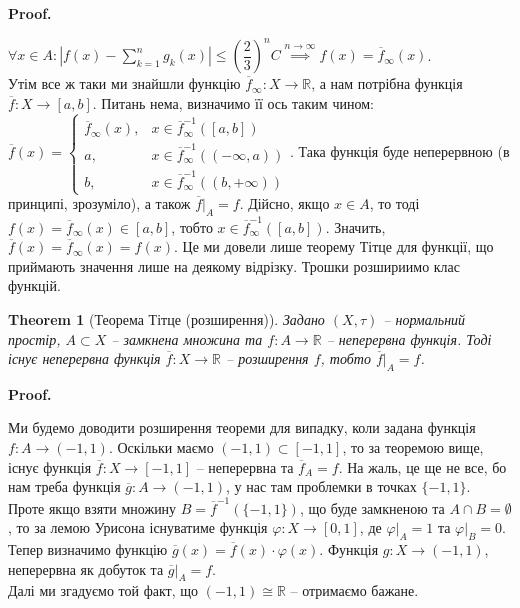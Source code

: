 \documentclass[a4paper, 10pt]{article}
\makeatletter
\theoremstyle{theoremdd}
\newtheorem{theorem}{Theorem}[subsection]
\renewenvironment{proof}[1][Proof.\\]{\par
\pushQED{\hfill \qed}%
\normalfont \topsep6\p@\@plus6\p@\relax
\trivlist
\item\relax
{\bfseries
#1\@addpunct{.}}\hspace\labelsep\ignorespaces
}{%
\popQED\endtrivlist\@endpefalse
}
\makeatother
\begin{document}
\begin{proof}
$\forall x \in A: \displaystyle\left| f(x) - \sum_{k=1}^n g_k(x) \right| \leq \left(\dfrac{2}{3}\right)^n C \overset{n \to \infty}{\implies} f(x) = \overline{f}_\infty(x)$.\\
Утім все ж таки ми знайшли функцію $\overline{f}_\infty \colon X \to \mathbb{R}$, а нам потрібна функція $\overline{f} \colon X \to [a,b]$. Питань нема, визначимо її ось таким чином: $\overline{f}(x) = \begin{cases} \overline{f}_\infty(x), & x \in \overline{f}_\infty^{-1}([a,b]) \\ a, & x \in \overline{f}_\infty^{-1}((-\infty,a)) \\ b, & x \in \overline{f}_\infty^{-1}((b,+\infty)) \end{cases}$. Така функція буде неперервною (в принципі, зрозуміло), а також $\overline{f}|_A = f$. Дійсно, якщо $x \in A$, то тоді $f(x) = \overline{f}_\infty(x) \in [a,b]$, тобто $x \in \overline{f}_\infty^{-1}([a,b])$. Значить, $\overline{f}(x) = \overline{f}_\infty(x) = f(x)$.
\end{proof}
\noindent
Це ми довели лише теорему Тітце для функції, що приймають значення лише на деякому відрізку. Трошки розшириимо клас функцій.

\begin{theorem}[Теорема Тітце (розширення)]
Задано $(X,\tau)$ -- нормальний простір, $A \subset X$ -- замкнена множина та $f \colon A \to \mathbb{R}$ -- неперервна функція. Тоді існує неперервна функція $\overline{f} \colon X \to \mathbb{R}$ -- розширення $f$, тобто $\overline{f}|_{A} = f$.
\end{theorem}

\begin{proof}
Ми будемо доводити розширення теореми для випадку, коли задана функція $f \colon A \to (-1,1)$. Оскільки маємо $(-1,1) \subset [-1,1]$, то за теоремою вище, існує функція $\overline{f} \colon X \to [-1,1]$ -- неперервна та $\overline{f}_A = f$. На жаль, це ще не все, бо нам треба функція $\overline{g} \colon A \to (-1,1)$, у нас там проблемки в точках $\{-1,1\}$.\\
Проте якщо взяти множину $B = \overline{f}^{-1}(\{-1,1\})$, що буде замкненою та $A \cap B = \emptyset$, то за лемою Урисона існуватиме функція $\varphi \colon X \to [0,1]$, де $\varphi|_A = 1$ та $\varphi|_B = 0$. Тепер визначимо функцію $\overline{g}(x) = \overline{f}(x) \cdot \varphi(x)$. Функція $g \colon X \to (-1,1)$, неперервна як добуток та $\overline{g}|_A = f$.\\
Далі ми згадуємо той факт, що $(-1,1) \cong \mathbb{R}$ -- отримаємо бажане.
\end{proof}
\end{document}
